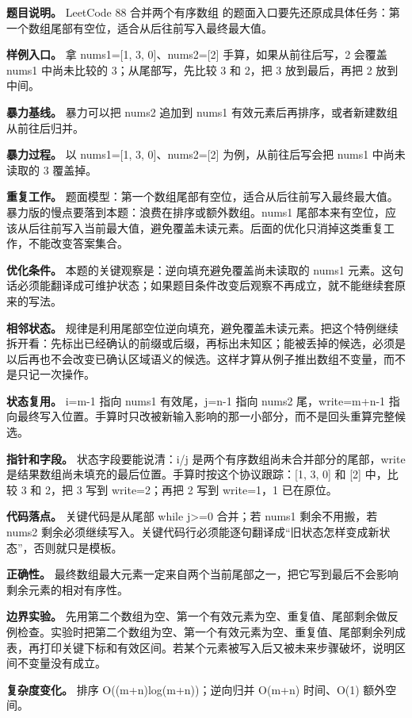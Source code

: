 \textbf{题目说明。} LeetCode 88 合并两个有序数组 的题面入口要先还原成具体任务：第一个数组尾部有空位，适合从后往前写入最终最大值。

\textbf{样例入口。} 拿 nums1=[1, 3, 0]、nums2=[2] 手算，如果从前往后写，2 会覆盖 nums1 中尚未比较的 3；从尾部写，先比较 3 和 2，把 3 放到最后，再把 2 放到中间。

\textbf{暴力基线。} 暴力可以把 nums2 追加到 nums1 有效元素后再排序，或者新建数组从前往后归并。

\textbf{暴力过程。} 以 nums1=[1, 3, 0]、nums2=[2] 为例，从前往后写会把 nums1 中尚未读取的 3 覆盖掉。

\textbf{重复工作。} 题面模型：第一个数组尾部有空位，适合从后往前写入最终最大值。暴力版的慢点要落到本题：浪费在排序或额外数组。nums1 尾部本来有空位，应该从后往前写入当前最大值，避免覆盖未读元素。后面的优化只消掉这类重复工作，不能改变答案集合。

\textbf{优化条件。} 本题的关键观察是：逆向填充避免覆盖尚未读取的 nums1 元素。这句话必须能翻译成可维护状态；如果题目条件改变后观察不再成立，就不能继续套原来的写法。

\textbf{相邻状态。} 规律是利用尾部空位逆向填充，避免覆盖未读元素。把这个特例继续拆开看：先标出已经确认的前缀或后缀，再标出未知区；能被丢掉的候选，必须是以后再也不会改变已确认区域语义的候选。这样才算从例子推出数组不变量，而不是只记一次操作。

\textbf{状态复用。} i=m-1 指向 nums1 有效尾，j=n-1 指向 nums2 尾，write=m+n-1 指向最终写入位置。手算时只改被新输入影响的那一小部分，而不是回头重算完整候选。

\textbf{指针和字段。} 状态字段要能说清：i/j 是两个有序数组尚未合并部分的尾部，write 是结果数组尚未填充的最后位置。手算时按这个协议跟踪：[1, 3, 0] 和 [2] 中，比较 3 和 2，把 3 写到 write=2；再把 2 写到 write=1，1 已在原位。

\textbf{代码落点。} 关键代码是从尾部 while j>=0 合并；若 nums1 剩余不用搬，若 nums2 剩余必须继续写入。关键代码行必须能逐句翻译成“旧状态怎样变成新状态”，否则就只是模板。

\textbf{正确性。} 最终数组最大元素一定来自两个当前尾部之一，把它写到最后不会影响剩余元素的相对有序性。

\textbf{边界实验。} 先用第二个数组为空、第一个有效元素为空、重复值、尾部剩余做反例检查。实验时把第二个数组为空、第一个有效元素为空、重复值、尾部剩余列成表，再打印关键下标和有效区间。若某个元素被写入后又被未来步骤破坏，说明区间不变量没有成立。

\textbf{复杂度变化。} 排序 O((m+n)log(m+n))；逆向归并 O(m+n) 时间、O(1) 额外空间。


